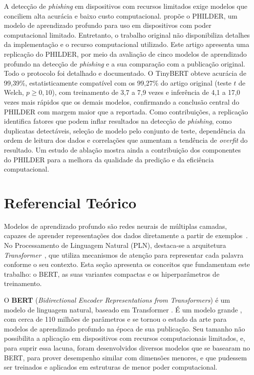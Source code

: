 \documentclass[12pt]{article}
\begin{document}
\begin{resumo} 

        A detecção de \textit{phishing} em dispositivos com recursos limitados exige modelos que conciliem alta acurácia e baixo custo computacional. \cite{bispo2025philder} propõe o PHILDER, um modelo de aprendizado profundo para uso em dispositivos com poder computacional limitado. Entretanto, o trabalho original não disponibiliza detalhes da implementação e o recurso computacional utilizado. Este artigo apresenta uma replicação do PHILDER, por meio da avaliação de cinco modelos de aprendizado profundo na detecção de \textit{phishing}  e a sua comparação com a publicação original. Todo o protocolo foi detalhado e documentado. O TinyBERT obteve acurácia de 99,39\%, estatisticamente compatível com os 99,27\% do artigo original (teste $t$ de Welch, $p \geq 0{,}10$), com treinamento de 3,7 a 7,9 vezes e inferência de 4,1 a 17,0 vezes mais rápidos que os demais modelos, confirmando a conclusão central do PHILDER com margem maior que a reportada. Como contribuições, a replicação identifica fatores que podem inflar resultados na detecção de \textit{phishing}, como duplicatas detectáveis, seleção de modelo pelo conjunto de teste, dependência da ordem de leitura dos dados e correlações que aumentam a tendência de \textit{overfit} do resultado. Um estudo de ablação mostra ainda a contribuição dos componentes do PHILDER para a melhora da qualidade da predição e da eficiência computacional.
        
\end{resumo}

\section{Referencial Teórico}
\label{sec:refteorico}

         Modelos de aprendizado profundo são redes neurais de múltiplas camadas, capazes de aprender representações dos dados diretamente a partir de exemplos~\cite{goodfellow2016deep}. No Processamento de Linguagem Natural (PLN), destaca-se a arquitetura \textit{Transformer}~\cite{vaswani2017attention}, que utiliza mecanismos de atenção para representar cada palavra conforme o seu contexto. Esta seção apresenta os conceitos que fundamentam este trabalho: o BERT, as suas variantes compactas e os hiperparâmetros de treinamento.
        
          O \textbf{BERT} (\textit{Bidirectional Encoder Representations from Transformers}) é um modelo de linguagem natural, baseado em Transformer \cite{devlin2019bert}. É um modelo grande , com cerca de 110 milhões de parâmetros e se tornou o estado da arte para modelos de aprendizado profundo na época de sua publicação. Seu tamanho não possibilita a aplicação em dispositivos com recursos computacionais limitados, e, para suprir essa lacuna, foram desenvolvidos diversos modelos que se basearam no BERT, para prover desempenho similar com dimensões menores, e que pudessem ser treinados e aplicados em estruturas de menor poder computacional.
           
\end{document}
